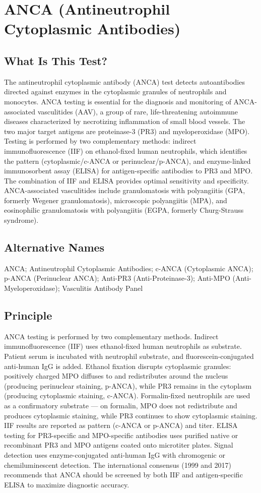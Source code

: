 \chapter{ANCA (Antineutrophil Cytoplasmic Antibodies)}

\section*{What Is This Test?}
The antineutrophil cytoplasmic antibody (ANCA) test detects autoantibodies directed against enzymes in the cytoplasmic granules of neutrophils and monocytes. ANCA testing is essential for the diagnosis and monitoring of ANCA-associated vasculitides (AAV), a group of rare, life-threatening autoimmune diseases characterized by necrotizing inflammation of small blood vessels. The two major target antigens are proteinase-3 (PR3) and myeloperoxidase (MPO). Testing is performed by two complementary methods: indirect immunofluorescence (IIF) on ethanol-fixed human neutrophils, which identifies the pattern (cytoplasmic/c-ANCA or perinuclear/p-ANCA), and enzyme-linked immunosorbent assay (ELISA) for antigen-specific antibodies to PR3 and MPO. The combination of IIF and ELISA provides optimal sensitivity and specificity. ANCA-associated vasculitides include granulomatosis with polyangiitis (GPA, formerly Wegener granulomatosis), microscopic polyangiitis (MPA), and eosinophilic granulomatosis with polyangiitis (EGPA, formerly Churg-Strauss syndrome).

\section*{Alternative Names}
ANCA; Antineutrophil Cytoplasmic Antibodies; c-ANCA (Cytoplasmic ANCA); p-ANCA (Perinuclear ANCA); Anti-PR3 (Anti-Proteinase-3); Anti-MPO (Anti-Myeloperoxidase); Vasculitis Antibody Panel

\section*{Principle}
ANCA testing is performed by two complementary methods. Indirect immunofluorescence (IIF) uses ethanol-fixed human neutrophils as substrate. Patient serum is incubated with neutrophil substrate, and fluorescein-conjugated anti-human IgG is added. Ethanol fixation disrupts cytoplasmic granules: positively charged MPO diffuses to and redistributes around the nucleus (producing perinuclear staining, p-ANCA), while PR3 remains in the cytoplasm (producing cytoplasmic staining, c-ANCA). Formalin-fixed neutrophils are used as a confirmatory substrate --- on formalin, MPO does not redistribute and produces cytoplasmic staining, while PR3 continues to show cytoplasmic staining. IIF results are reported as pattern (c-ANCA or p-ANCA) and titer. ELISA testing for PR3-specific and MPO-specific antibodies uses purified native or recombinant PR3 and MPO antigens coated onto microtiter plates. Signal detection uses enzyme-conjugated anti-human IgG with chromogenic or chemiluminescent detection. The international consensus (1999 and 2017) recommends that ANCA should be screened by both IIF and antigen-specific ELISA to maximize diagnostic accuracy.

